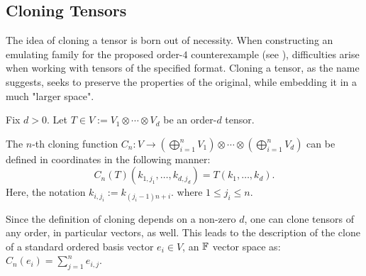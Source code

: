 \documentclass[../Lael_John_MasterThesis_Draft.tex]{subfiles}
\begin{document}
\subsection{Cloning Tensors}\label{subsection:tensorcloning}
The idea of cloning a tensor is born out of necessity. When constructing an emulating family for the proposed order-$4$ counterexample (see ), difficulties arise when working with tensors of the specified format. Cloning a tensor, as the name suggests, seeks to preserve the properties of the original, while embedding it in a much "larger space".
\begin{definition}\label{defn:tensorcloning}
    Fix $d > 0$. Let $T \in V:= V_1 \otimes \cdots \otimes V_d$ be an order-$d$ tensor.
    
    The $n$-th cloning function $C_n: V \to \left(\bigoplus_{i=1}^n V_1\right) \otimes \cdots \otimes \left(\bigoplus_{i=1}^n V_d\right)$ can be defined in coordinates in the following manner: $$C_n(T)(k_{1, j_1}, \ldots, k_{d, j_d}) = T(k_1, \ldots, k_d).$$Here, the notation $k_{i,j_i}:= k_{(j_i-1)n + i}$. where $1 \leq j_i \leq n$.
\end{definition}
\begin{observation}
    Since the definition of cloning depends on a non-zero $d$, one can clone tensors of any order, in particular vectors, as well. This leads to the description of the clone of a standard ordered basis vector $e_i \in V$, an $\mathbb{F}$ vector space as: $C_n(e_i) = \sum_{j=1}^{n} e_{i,j}.$
\end{observation} 
\end{document}
